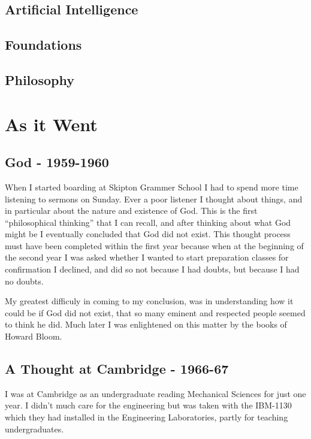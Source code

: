 \documentclass[10pt,titlepage]{book}
\begin{document}
\section{Artificial Intelligence}

\section{Foundations}

\section{Philosophy}

\chapter{As it Went}

\section{God - 1959-1960}

When I started boarding at Skipton Grammer School I had to spend more time listening to sermons on Sunday.
Ever a poor listener I thought about things, and in particular about the nature and existence of God.
This is the first ``philosophical thinking'' that I can recall, and after thinking about what God might be I eventually concluded that God did not exist.
This thought process must have been completed within the first year because when at the beginning of the second year I was asked whether I wanted to start preparation classes for confirmation I declined, and did so not because I had doubts, but because I had no doubts.

My greatest difficuly in coming to my conclusion, was in understanding how it could be if God did not exist, that so many eminent and respected people seemed to think he did.
Much later I was enlightened on this matter by the books of Howard Bloom.

\section{A Thought at Cambridge - 1966-67}

I was at Cambridge as an undergraduate reading Mechanical Sciences for just one year.
I didn't much care for the engineering but was taken with the IBM-1130 which they had installed in the Engineering Laboratories, partly for teaching undergraduates.
\end{document}
